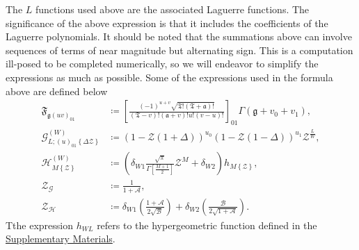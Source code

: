 The $L$ functions used above are the associated Laguerre functions. The
significance of the above expression is that it includes the coefficients of the
Laguerre polynomials. It should be noted that the summations above can involve
sequences of terms of near magnitude but alternating sign. This is a computation
ill-posed to be completed numerically, so we will endeavor to simplify the
expressions as much as possible. Some of the expressions used in the formula
above are defined below
\begin{align}
\mathfrak{F}_{\mathfrak{g}\left(uv\right)_{01}}
    &\coloneqq
        \left[
            \frac
            {
                \left(-1\right)^{u+v}
                \sqrt{
                    \mathfrak{T}!
                    \left(\mathfrak{T}+\mathfrak{a}\right)!
                }
            }
            {
                \left(\mathfrak{T}-v\right)!
                \left(\mathfrak{a}+v\right)!
                u!
                \left(v-u\right)!
            }
        \right]_{01}
        \Gamma\left(\mathfrak{g}+v_{0}+v_{1}\right)
,\\
\mathcal{G}
_{L;\left(u\right)_{01}\left\{\Delta\mathcal{Z}\right\}}
^{\left(W\right)}
    &\coloneqq
        \left(1-\mathcal{Z}\left(1+\Delta\right)\right)^{u_{0}}
        \left(1-\mathcal{Z}\left(1-\Delta\right)\right)^{u_{1}}
        \mathcal{Z}^{\frac{L}{W}}
,\\
\mathcal{H}_{M\left\{\mathcal{Z}\right\}}^{\left(W\right)}
    &\coloneqq
        \left(
            \delta_{W1}
            \frac{\sqrt{\pi}}{\Gamma\left[\frac{M+1}{2}\right]}
            \mathcal{Z}^{M}
            +
            \delta_{W2}
        \right)
        h_{M\left\{\mathcal{Z}\right\}}
,\\
\mathcal{Z}_{\mathcal{G}} &\coloneqq \frac{1}{1+\mathcal{A}}
\label{def:Z0}
,\\
\mathcal{Z}_{\mathcal{H}}
    &\coloneqq
        \delta_{W1}
        \left(
            \frac{1+\mathcal{A}}{2\sqrt{\mathcal{B}}}
        \right)
            +
        \delta_{W2}
        \left(
            \frac{\mathcal{B}}{2\sqrt{1+\mathcal{A}}}
        \right)
        \label{def:Z1}
.
\end{align}
Tthe expression $h_{WL}$ refers to the hypergeometric function defined in the
\href{https://gitlab.com/cantankerous-impurity/Documentation/-/tree/core/SUNY--Buffalo/Dissertation/Supplementary%20Materials?ref_type=heads}{Supplementary Materials}.

